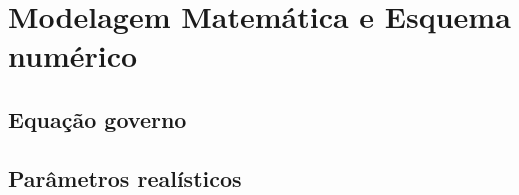 \chapter{Modelagem Matemática e Esquema numérico}
\label{chapter:cap2}
\section{\textbf{Equação governo}}
\section{\textbf{Parâmetros realísticos}}
